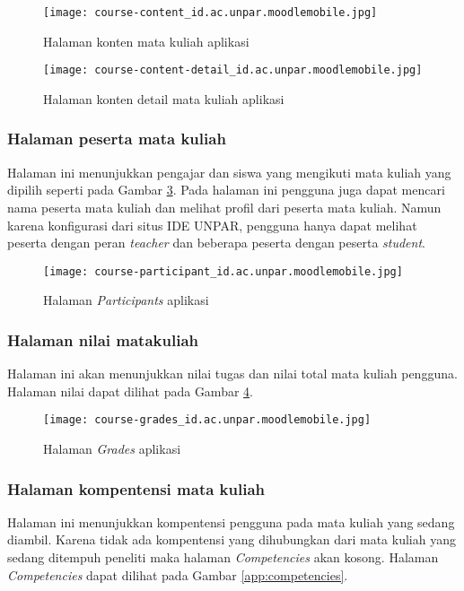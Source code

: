 \begin{figure}[H] 
	\centering  
	\texttt{[image: course-content\_id.ac.unpar.moodlemobile.jpg]}  
	\caption[Halaman konten mata kuliah aplikasi] {Halaman konten mata kuliah aplikasi} 
	\label{app:content} 
\end{figure}  

\begin{figure}[H] 
	\centering  
	\texttt{[image: course-content-detail\_id.ac.unpar.moodlemobile.jpg]}  
	\caption[Halaman konten detail mata kuliah aplikasi] {Halaman konten detail mata kuliah aplikasi} 
	\label{app:content:detail} 
\end{figure}  

\subsubsection{Halaman peserta mata kuliah}

Halaman ini menunjukkan pengajar dan siswa yang mengikuti mata kuliah yang dipilih seperti pada Gambar \ref{app:participants}. Pada halaman ini pengguna juga dapat mencari nama peserta mata kuliah dan melihat profil dari peserta mata kuliah. Namun karena konfigurasi dari situs IDE UNPAR, pengguna hanya dapat melihat peserta dengan peran \textit{teacher} dan beberapa peserta dengan peserta \textit{student}. 

\begin{figure}[H] 
	\centering  
	\texttt{[image: course-participant\_id.ac.unpar.moodlemobile.jpg]}  
	\caption[Halaman \textit{Participants} aplikasi] {Halaman \textit{Participants} aplikasi} 
	\label{app:participants} 
\end{figure}  

\subsubsection{Halaman nilai matakuliah}
Halaman ini akan menunjukkan nilai tugas dan nilai total mata kuliah pengguna. Halaman nilai dapat dilihat pada Gambar \ref{app:grades}.

\begin{figure}[H] 
	\centering  
	\texttt{[image: course-grades\_id.ac.unpar.moodlemobile.jpg]}  
	\caption[Halaman \textit{Grades} aplikasi] {Halaman \textit{Grades} aplikasi} 
	\label{app:grades} 
\end{figure}  

\subsubsection{Halaman kompentensi mata kuliah}
Halaman ini menunjukkan kompentensi pengguna pada mata kuliah yang sedang diambil. Karena tidak ada kompentensi yang dihubungkan dari mata kuliah yang sedang ditempuh peneliti maka halaman \textit{Competencies} akan kosong. Halaman \textit{Competencies} dapat dilihat pada Gambar \ref{app:competencies}.

